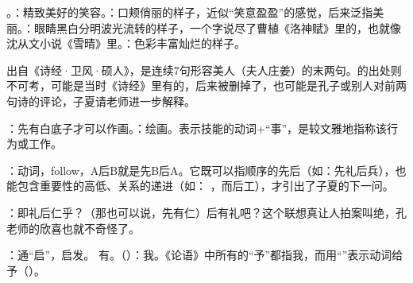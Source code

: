 {
\begin{lyblobitemize}
\item {}。：精致美好的笑容。：口颊俏丽的样子，近似“笑意盈盈”的感觉，后来泛指美丽。：眼睛黑白分明波光流转的样子，一个字说尽了曹植《洛神赋》里的，也就像沈从文小说《雪晴》里。：色彩丰富灿烂的样子。

出自《诗经·卫风·硕人》，是连续7句形容美人（夫人庄姜）的末两句。的出处则不可考，可能是当时《诗经》里有的，后来被删掉了，也可能是孔子或别人对前两句诗的评论，子夏请老师进一步解释。
\item {}：先有白底子才可以作画。：绘画。表示技能的动词+“事”，是较文雅地指称该行为或工作。

：动词，follow，A后B就是先B后A。它既可以指顺序的先后（如：先礼后兵），也能包含重要性的高低、关系的递进（如： ，而后工），才引出了子夏的下一问。

\item {}：即礼后仁乎？（那也可以说，先有仁）后有礼吧？这个联想真让人拍案叫绝，孔老师的欣喜也就不奇怪了。
\item {}：通“启”，启发。 有。（）：我。《论语》中所有的“予”都指我，而用“”表示动词给予（）。
\end{lyblobitemize}
}
{}
%


